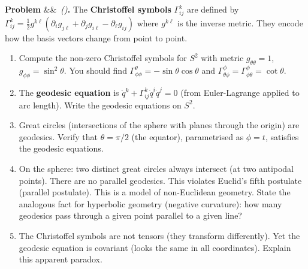 \documentclass[12pt,a4paper]{article}
\newcounter{problem}
\newenvironment{problem}[1][]{\refstepcounter{problem}\par\vspace{6pt}\noindent\textbf{\color{MidBlue}Problem \theproblem}\ifx&#1&\else\ \textit{(#1)}\fi\textbf{.}\enskip}{\par\vspace{4pt}}
\begin{document}
\begin{problem}
\label{prob:geodesics}
The \textbf{Christoffel symbols} $\Gamma^k_{ij}$ are defined by
$\Gamma^k_{ij} = \frac{1}{2}g^{k\ell}\left(\partial_i g_{j\ell}+\partial_j g_{i\ell}-\partial_\ell g_{ij}\right)$
where $g^{k\ell}$ is the inverse metric. They encode how the basis vectors change from point to point.
\begin{enumerate}[label=(\alph*),topsep=2pt]
  \item Compute the non-zero Christoffel symbols for $S^2$ with metric $g_{\theta\theta}=1$, $g_{\phi\phi}=\sin^2\theta$. You should find $\Gamma^\theta_{\phi\phi}=-\sin\theta\cos\theta$ and $\Gamma^\phi_{\theta\phi}=\Gamma^\phi_{\phi\theta}=\cot\theta$.
  \item The \textbf{geodesic equation} is $\ddot q^k + \Gamma^k_{ij}\dot q^i\dot q^j = 0$ (from Euler-Lagrange applied to arc length). Write the geodesic equations on $S^2$.
  \item Great circles (intersections of the sphere with planes through the origin) are geodesics. Verify that $\theta=\pi/2$ (the equator), parametrised as $\phi=t$, satisfies the geodesic equations.
  \item On the sphere: two distinct great circles always intersect (at two antipodal points). There are no parallel geodesics. This violates Euclid's fifth postulate (parallel postulate). This is a model of non-Euclidean geometry. State the analogous fact for hyperbolic geometry (negative curvature): how many geodesics pass through a given point parallel to a given line?
  \item The Christoffel symbols are not tensors (they transform differently). Yet the geodesic equation is covariant (looks the same in all coordinates). Explain this apparent paradox.
\end{enumerate}
\end{problem}

\begin{center}
\end{center}
\end{document}
